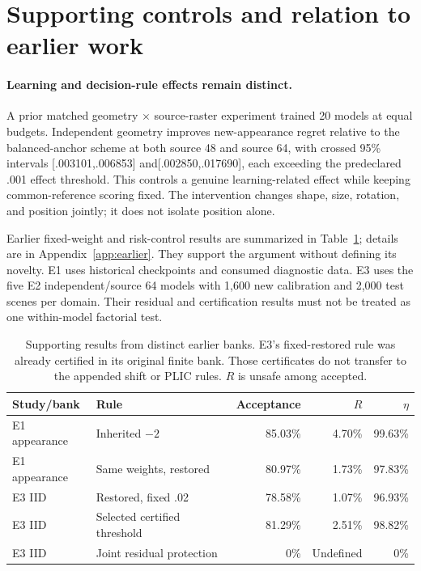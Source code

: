\section{Supporting controls and relation to earlier work}
\label{sec:discussion}
\paragraph{Learning and decision-rule effects remain distinct.}
A prior matched geometry $\times $ source-raster experiment trained 20 models at
equal budgets. Independent geometry improves new-appearance regret relative to
the balanced-anchor scheme at both source 48 and source 64, with crossed 95\%
intervals [.003101,.006853] and[.002850,.017690], each exceeding the predeclared
.001 effect threshold. This controls a genuine learning-related effect while
keeping common-reference scoring fixed. The intervention changes shape, size,
rotation, and position jointly; it does not isolate position alone.

Earlier fixed-weight and risk-control results are summarized in
Table~\ref{tab:support}; details are in Appendix~\ref{app:earlier}. They support
the argument without defining its novelty. E1 uses historical checkpoints and
consumed diagnostic data. E3 uses the five E2 independent/source 64 models with
1,600 new calibration and 2,000 test scenes per domain. Their residual and
certification results must not be treated as one within-model factorial test.

\begin{table}[t]
\centering\small
\caption{Supporting results from distinct earlier banks. E3's fixed-restored
rule was already certified in its original finite bank. Those certificates do
not transfer to the appended shift or PLIC rules. $R$ is unsafe among accepted.}
\label{tab:support}
\begin{tabular}{llrrr}
\toprule
Study/bank & Rule & Acceptance & $R$ & $\eta $\\
\midrule
E1 appearance & Inherited $-2$ &85.03\%&4.70\%&99.63\%\\
E1 appearance & Same weights, restored &80.97\%&1.73\%&97.83\%\\
E3 IID & Restored, fixed .02 &78.58\%&1.07\%&96.93\%\\
E3 IID & Selected certified threshold &81.29\%&2.51\%&98.82\%\\
E3 IID & Joint residual protection &0\%&Undefined&0\%\\
\bottomrule
\end{tabular}
\end{table}

